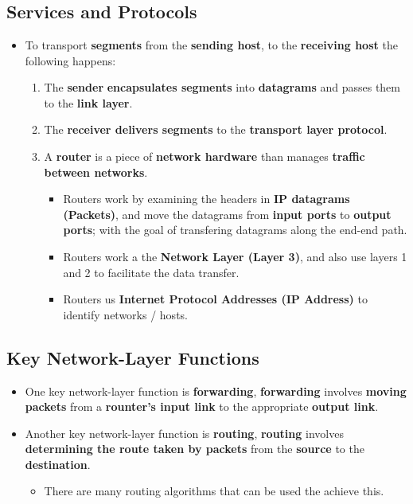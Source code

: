 \documentclass{article}
\begin{document}
\section*{}

    \subsection*{Services and Protocols}
    \begin{itemize}
        \item To transport \textbf{segments} from the \textbf{sending host}, to the \textbf{receiving host} the following happens:
        \begin{enumerate}
            \item The \textbf{sender} \textbf{encapsulates segments} into \textbf{datagrams} and passes them to the \textbf{link layer}.
            \item The \textbf{receiver delivers segments} to the \textbf{transport layer protocol}. 
            \item A \textbf{router} is a piece of \textbf{network hardware} than manages \textbf{traffic between networks}.
            \begin{itemize}
                \item Routers work by examining the headers in \textbf{IP datagrams (Packets)}, and move the datagrams from \textbf{input ports} to \textbf{output ports}; with the goal of transfering datagrams along the end-end path.
                \item Routers work a the \textbf{Network Layer (Layer 3)}, and also use layers 1 and 2 to facilitate the data transfer.
                \item Routers us \textbf{Internet Protocol Addresses (IP Address)} to identify networks / hosts.
            \end{itemize}
        \end{enumerate}
    \end{itemize}

    \subsection*{Key Network-Layer Functions}
    \begin{itemize}
        \item One key network-layer function is \textbf{forwarding}, \textbf{forwarding} involves \textbf{moving packets} from a \textbf{rounter's input link} to the appropriate \textbf{output link}.
        \item Another key network-layer function is \textbf{routing}, \textbf{routing} involves \textbf{determining the route taken by packets} from the \textbf{source} to the \textbf{destination}.
        \begin{itemize}
            \item There are many routing algorithms that can be used the achieve this.
        \end{itemize}
    \end{itemize}
\end{document}
